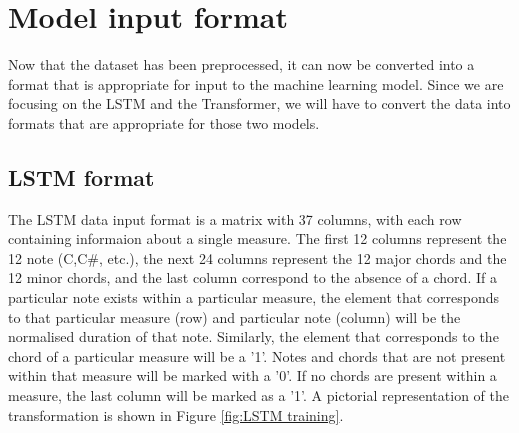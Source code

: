 


\section{Model input format}
Now that the dataset has been preprocessed, it can now be converted into a format that is appropriate for input to the machine learning model. Since we are focusing on the LSTM and the Transformer, we will have to convert the data into formats that are appropriate for those two models.

\subsection{LSTM format}
The LSTM data input format is a matrix with 37 columns, with each row containing informaion about a single measure. The first 12 columns represent the 12 note (C,C\#, etc.), the next 24 columns represent the 12 major chords and the 12 minor chords, and the last column correspond to the absence of a chord. If a particular note exists within a particular measure, the element that corresponds to that particular measure (row) and particular note (column) will be the normalised duration of that note. Similarly, the element that corresponds to the chord of a particular measure will be a '1'. Notes and chords that are not present within that measure will be marked with a '0'. If no chords are present within a measure, the last column will be marked as a '1'. A pictorial representation of the transformation is shown in Figure \ref{fig:LSTM training}.

